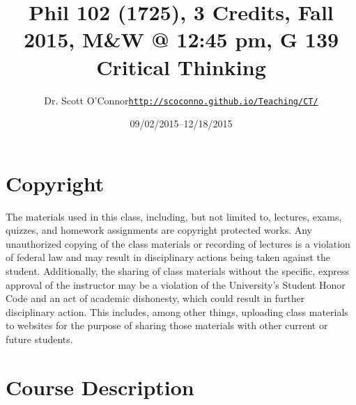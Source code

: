 \documentclass[article,oneside]{memoir}
\makeatletter
\def\myauthor{Author}
\def\mytitle{Title}
\def\mycopyright{\myauthor}
\def\myweb{\href{http://scoconno.github.io/Teaching/CT/}{http://scoconno.github.io/Teaching/CT/}}
\def\myauthor{Dr. Scott O'Connor}
\def\mytitle{{\normalsize Phil 102 (1725), 3 Credits, Fall 2015, M\&W @ 12:45 pm, G 139 \newline} \HUGE Critical Thinking}
\makeatother
\begin{document}
\setsansfont[Mapping=tex-text]{Georgia} 
\setmonofont[Mapping=tex-text,Scale=0.8]{Georgia} 

\def\ind{\hangindent=1 true cm\hangafter=1 \noindent}
\def\labelitemi{$\cdot$}

\pagestyle{kjh}

\title{\LARGE \mytitle}     
\author{\Large\myauthor \newline \footnotesize\texttt{\noindent\myweb}}
\date{09/02/2015--12/18/2015}

\published{\,}

\maketitle




%
%

\section{Copyright}
The materials used in this class, including, but not limited to, lectures, exams, quizzes, and homework assignments are copyright protected works.  Any unauthorized copying of the class materials or recording of lectures is a violation of federal law and may result in disciplinary actions being taken against the student.  Additionally, the sharing of class materials without the specific, express approval of the instructor may be a violation of the University's Student Honor Code and an act of academic dishonesty, which could result in further disciplinary action.  This includes, among other things, uploading class materials to websites for the purpose of sharing those materials with other current or future students.  

\section{Course Description}
\end{document}
